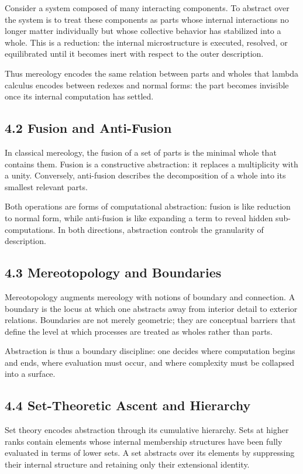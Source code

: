 \documentclass[12pt,letterpaper]{article}
\begin{document}
Consider a system composed of many interacting components. To abstract over the system is to treat these components as parts whose internal interactions no longer matter individually but whose collective behavior has stabilized into a whole. This is a reduction: the internal microstructure is executed, resolved, or equilibrated until it becomes inert with respect to the outer description.

Thus mereology encodes the same relation between parts and wholes that lambda calculus encodes between redexes and normal forms: the part becomes invisible once its internal computation has settled.

\subsection{4.2 Fusion and Anti-Fusion}

In classical mereology, the fusion of a set of parts is the minimal whole that contains them. Fusion is a constructive abstraction: it replaces a multiplicity with a unity. Conversely, anti-fusion describes the decomposition of a whole into its smallest relevant parts.

Both operations are forms of computational abstraction: fusion is like reduction to normal form, while anti-fusion is like expanding a term to reveal hidden sub-computations. In both directions, abstraction controls the granularity of description.

\subsection{4.3 Mereotopology and Boundaries}

Mereotopology augments mereology with notions of boundary and connection. A boundary is the locus at which one abstracts away from interior detail to exterior relations. Boundaries are not merely geometric; they are conceptual barriers that define the level at which processes are treated as wholes rather than parts.

Abstraction is thus a boundary discipline: one decides where computation begins and ends, where evaluation must occur, and where complexity must be collapsed into a surface.

\subsection{4.4 Set-Theoretic Ascent and Hierarchy}

Set theory encodes abstraction through its cumulative hierarchy. Sets at higher ranks contain elements whose internal membership structures have been fully evaluated in terms of lower sets. A set abstracts over its elements by suppressing their internal structure and retaining only their extensional identity.
\end{document}

